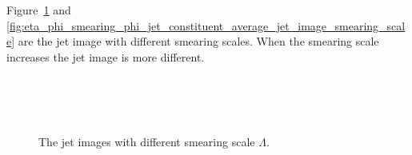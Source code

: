 \documentclass[12pt]{article}
\begin{document}
        Figure~\ref{fig:eta_phi_smearing_jet_constituent_jet_image_smearing_scale} and \ref{fig:eta_phi_smearing_phi_jet_constituent_average_jet_image_smearing_scale} are the jet image with different smearing scales. When the smearing scale increases the jet image is more different.
        \begin{figure}[htpb]
            \centering
             \\
             \\
             \\
            \caption{The jet images with different smearing scale $\Lambda$.}
            \label{fig:eta_phi_smearing_jet_constituent_jet_image_smearing_scale}
        \end{figure}
\end{document}
